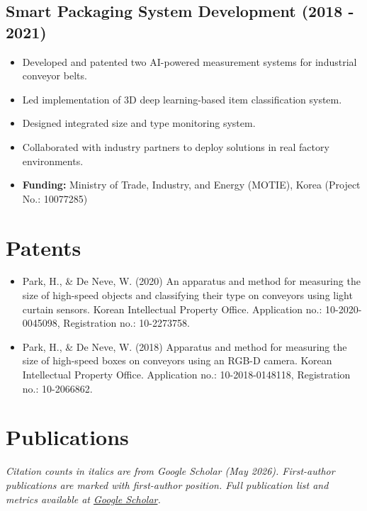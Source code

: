 \documentclass[11pt]{article}
\begin{document}
\subsection{Smart Packaging System Development (2018 - 2021)}
\begin{itemize}
    \item[\checkmark] Developed and patented two AI-powered measurement systems for industrial conveyor belts.
    \item[\checkmark] Led implementation of 3D deep learning-based item classification system.
    \item[\checkmark] Designed integrated size and type monitoring system.
    \item[\checkmark] Collaborated with industry partners to deploy solutions in real factory environments.
    \item[\checkmark] \textbf{Funding:} Ministry of Trade, Industry, and Energy (MOTIE), Korea (Project No.: 10077285)
\end{itemize}

\section{Patents}
\begin{itemize}
    \item[\checkmark] Park, H., \& De Neve, W. (2020) An apparatus and method for measuring the size of high-speed objects and classifying their type on conveyors using light curtain sensors. Korean Intellectual Property Office. Application no.: 10-2020-0045098, Registration no.: 10-2273758.
    \item[\checkmark] Park, H., \& De Neve, W. (2018) Apparatus and method for measuring the size of high-speed boxes on conveyors using an RGB-D camera. Korean Intellectual Property Office. Application no.: 10-2018-0148118, Registration no.: 10-2066862.
\end{itemize}

\section{Publications}
\noindent\textit{Citation counts in italics are from Google Scholar (May 2026). First-author publications are marked with first-author position. Full publication list and metrics available at \href{https://scholar.google.com/citations?user=mFzW6LEAAAAJ&hl=ko}{Google Scholar}.}
\end{document}
